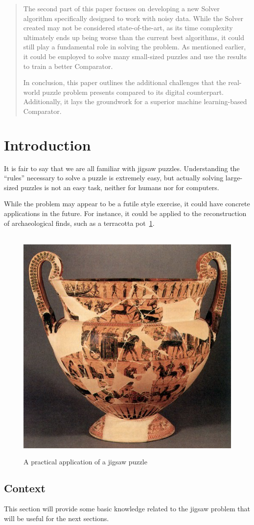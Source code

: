 \documentclass{article}
\begin{document}
\begin{abstract}
The second part of this paper focuses on developing a
new Solver algorithm specifically designed to work with noisy data.
While the Solver created may not be considered state-of-the-art,
as its time complexity ultimately ends up being worse than the current
best algorithms, it could still play a fundamental role in solving the problem.
As mentioned earlier, it could be employed to solve many small-sized
puzzles and use the results to train a better Comparator.

In conclusion, this paper outlines the additional challenges that the real-world
puzzle problem presents compared to its digital counterpart.
Additionally, it lays the groundwork for a superior machine learning-based Comparator.

\end{abstract}

\section{Introduction}
It is fair to say that we are all familiar with jigsaw puzzles.
Understanding the ``rules'' necessary to solve a puzzle is
extremely easy, but actually solving large-sized puzzles
is not an easy task, neither for humans nor for computers.

While the problem may appear to be a futile style exercise,
it could have concrete applications in the future. For instance,
it could be applied to the reconstruction of archaeological finds,
such as a terracotta pot~\cref{fig:pot}.

\begin{figure}[h]
  \caption{A practical application of a jigsaw puzzle}~\label{fig:pot}
  \includegraphics[height=0.25\textwidth]{pictures/terracotta_pot.jpg}
  \centering
\end{figure}


\subsection{Context}
This section will provide some basic knowledge
related to the jigsaw problem that will be useful
  for the next sections.
\end{document}
